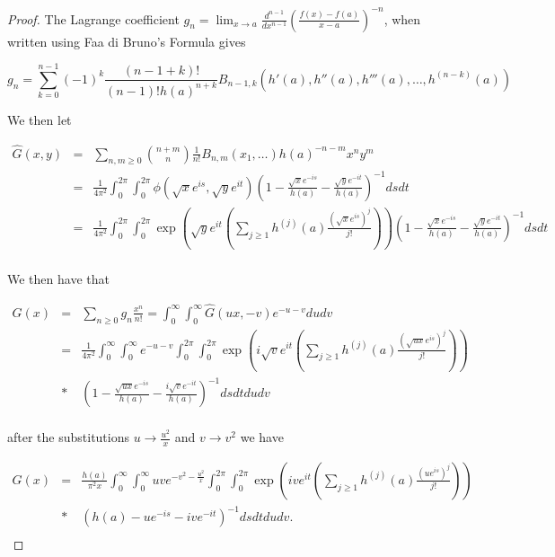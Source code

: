 \documentclass[12pt]{article}
\theoremstyle{plain}
\theoremstyle{definition}
\theoremstyle{remark}
\theoremstyle{definition}
\begin{document}
\begin{proof}
The Lagrange coefficient $g_n = \lim_{x \to a}\frac{d^{n-1}}{dx^{n-1}}\left(\frac{f(x)-f(a)}{x-a}\right)^{-n}$, when written using Faa di Bruno's Formula gives 

\begin{equation*}
    g_n = \sum_{k=0}^{n-1}(-1)^k\frac{(n-1+k)!}{(n-1)!h(a)^{n+k}}B_{n-1,k
    }(h'(a), h''(a), h'''(a), \dots, h^{(n-k)}(a))
\end{equation*}

We then let

\begin{eqnarray*}
\hat{G}(x,y) & = & \sum_{n,m\geq0}\binom{n+m}{n}\frac{1}{n!}B_{n,m}(x_1, \dots)h(a)^{-n-m} x^ny^m \\
& = &  \frac{1}{4\pi^2} \int_0^{2\pi}\int_0^{2\pi} \phi(\sqrt{x}e^{is},\sqrt{y}e^{it})\left(1-\frac{\sqrt{x}e^{-is}}{h(a)}-\frac{\sqrt{y}e^{-it}}{h(a)}\right)^{-1} ds dt\\
& = &  \frac{1}{4\pi^2} \int_0^{2\pi}\int_0^{2\pi} \exp\left(\sqrt{y}e^{it}\left(\sum_{j \geq 1}h^{(j)}(a) \frac{(\sqrt{x}e^{is})^j}{j!}\right)\right)\left(1-\frac{\sqrt{x}e^{-is}}{h(a)}-\frac{\sqrt{y}e^{-it}}{h(a)}\right)^{-1} ds dt\\
\end{eqnarray*}

We then have that

\begin{eqnarray*}
    G(x)& = & \sum_{n\geq0}g_n \frac{x^n}{n!} = \int_0^\infty \int_0^\infty \hat{G}(ux,-v)e^{-u-v}du dv \\
     & = &\frac{1}{4\pi^2} \int_0^\infty \int_0^\infty e^{-u-v}\int_0^{2\pi}\int_0^{2\pi} \exp\left(i\sqrt{v}e^{it}\left(\sum_{j \geq 1}h^{(j)}(a) \frac{(\sqrt{ux}e^{is})^j}{j!}\right)\right) \\
     & * & \left(1-\frac{\sqrt{ux}e^{-is}}{h(a)}-\frac{i\sqrt{v}e^{-it}}{h(a)}\right)^{-1} ds dt du dv\\
\end{eqnarray*}

after the substitutions $u \to \frac{u^2}{x}$  and $v \to v^2$ we have

\begin{eqnarray*}
    G(x)& = & \frac{h(a)}{\pi^2 x} \int_0^\infty\int_0^\infty uve^{-v^2-\frac{u^2}{x}}\int_0^{2\pi}\int_0^{2\pi} \exp\left(ive^{it}\left(\sum_{j \geq 1}h^{(j)}(a) \frac{(ue^{is})^j}{j!}\right)\right) \\
    & * & \left(h(a)-ue^{-is}-ive^{-it}\right)^{-1} ds dt du dv.\\
\end{eqnarray*}

\end{proof}
\end{document}

